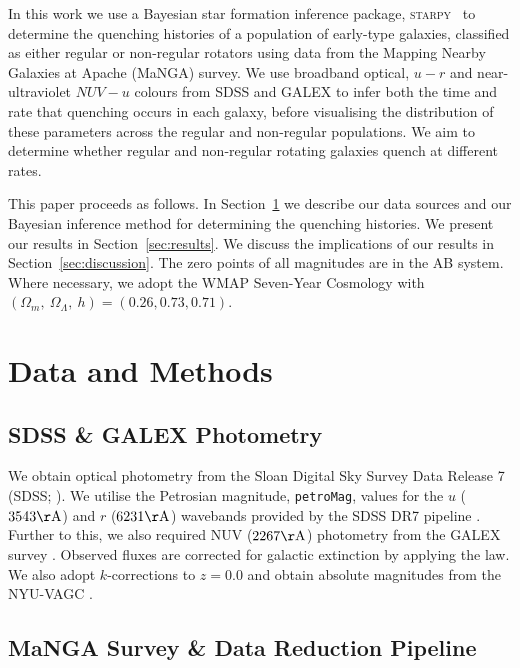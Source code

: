 \documentclass[useAMS,usenatbib]{mn2e}
\begin{document}
In this work we use a Bayesian star formation inference package, \textsc{starpy}~ to determine the quenching histories of a population of early-type galaxies, classified as either regular or non-regular rotators using data from the Mapping Nearby Galaxies at Apache (MaNGA) survey. We use broadband optical, $u-r$ and near-ultraviolet $NUV-u$ colours from SDSS and GALEX to infer both the time and rate that quenching occurs in each galaxy, before visualising the distribution of these parameters across the regular and non-regular populations. We aim to determine whether regular and non-regular rotating galaxies quench at different rates. 

This paper proceeds as follows. In Section~\ref{sec:datamethods} we describe our data sources and our Bayesian inference method for determining the quenching histories. We present our results in Section~\ref{sec:results}. We discuss the implications of our results in Section~\ref{sec:discussion}. The zero points of all magnitudes are in the AB system. Where necessary, we adopt the WMAP Seven-Year Cosmology \citep{jarosik11} with $(\Omega_m , ~\Omega_\Lambda , ~h) = (0.26, 0.73, 0.71)$.



\section{Data and Methods}\label{sec:datamethods}

\subsection{SDSS \& GALEX Photometry}\label{sec:photom}

We obtain optical photometry from the Sloan Digital Sky Survey Data Release 7 (SDSS; \citealt{york00, abazajian09}). We utilise the Petrosian magnitude, {\tt petroMag}, values for the $u$ ($3543 \rm{\AA}$) and $r$ ($6231 \rm{\AA}$) wavebands provided by the SDSS DR7 pipeline \citep{stoughton02}. Further to this, we also required NUV ($2267 \rm{\AA}$) photometry from the GALEX survey \citep{martin05}. Observed fluxes are corrected for galactic extinction \citep{Oh11} by applying the \citet*{Cardelli89} law. We also adopt $k$-corrections to $z = 0.0$ and obtain absolute magnitudes from the NYU-VAGC \citep{blanton05, padmanabhan08, blanton07}.

\subsection{MaNGA Survey \& Data Reduction Pipeline}\label{sec:manga}
\end{document}
